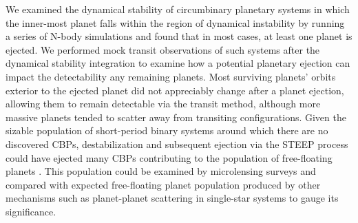 
We examined the dynamical stability of circumbinary planetary systems in which the inner-most planet falls within the region of dynamical instability by running a series of N-body simulations and found that in most cases, at least one planet is ejected.  We performed mock transit observations of such systems after the dynamical stability integration to examine how a potential planetary ejection can impact the detectability any remaining planets.  Most surviving planets' orbits exterior to the ejected planet did not appreciably change after a planet ejection, allowing them to remain detectable via the transit method, although more massive planets tended to scatter away from transiting configurations.  Given the sizable population of short-period binary systems \citep{Kirk2016} around which there are no discovered CBPs, destabilization and subsequent ejection via the STEEP process could have ejected many CBPs contributing to the population of free-floating planets \citep{Veras2012}.  This population could be examined by microlensing surveys \citep[e.g.][]{Sumi2011} and compared with expected free-floating planet population produced by other mechanisms such as planet-planet scattering in single-star systems to gauge its significance.

